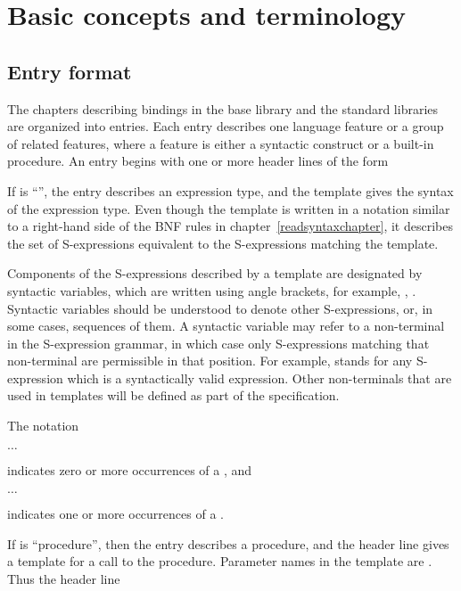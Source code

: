 \chapter{Basic concepts and terminology}
\label{basicchapter}

\section{Entry format}

The chapters describing bindings in the base library and the standard
libraries are organized
into entries.  Each entry describes one language feature or a group of
related features, where a feature is either a syntactic construct or a
built-in procedure.  An entry begins with one or more header lines of the form

\noindent{}\unpenalty

If  is ``\exprtype'', the entry describes an expression
type, and the template gives the syntax of the expression type.  Even
though the template is written in a notation similar to a right-hand
side of the BNF rules in chapter~\ref{readsyntaxchapter}, it describes
the set of S-expressions equivalent to the S-expressions matching the
template.

Components of the S-expressions described by a template are designated
by syntactic variables, which are written using angle brackets, for
example, , .  Syntactic variables
should be understood to denote other S-expressions, or, in some cases,
sequences of them.  A syntactic variable may refer to a non-terminal
in the S-expression grammar, in which case only S-expressions matching
that non-terminal are permissible in that position.  For example,
 stands for any S-expression which is a
syntactically valid expression.  Other non-terminals that are used in
templates will be defined as part of the specification.

The notation
\begin{tabbing}
\qquad {} $\ldots$
\end{tabbing}
indicates zero or more occurrences of a , and
\begin{tabbing}
\qquad {}  $\ldots$
\end{tabbing}
indicates one or more occurrences of a .

If  is ``procedure'', then the entry describes a procedure, and
the header line gives a template for a call to the procedure.  Parameter
names in the template are .  Thus the header line

